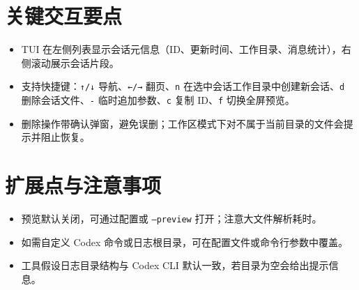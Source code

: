 \documentclass[12pt]{article}
\begin{document}
\section{关键交互要点}
\begin{itemize}[leftmargin=2em]
  \item TUI 在左侧列表显示会话元信息（ID、更新时间、工作目录、消息统计），右侧滚动展示会话片段。
  \item 支持快捷键：\texttt{↑/↓} 导航、\texttt{←/→} 翻页、\texttt{n} 在选中会话工作目录中创建新会话、\texttt{d} 删除会话文件、\texttt{-} 临时追加参数、\texttt{c} 复制 ID、\texttt{f} 切换全屏预览。
  \item 删除操作带确认弹窗，避免误删；工作区模式下对不属于当前目录的文件会提示并阻止恢复。
\end{itemize}

\section{扩展点与注意事项}
\begin{itemize}[leftmargin=2em]
  \item 预览默认关闭，可通过配置或 \texttt{--preview} 打开；注意大文件解析耗时。
  \item 如需自定义 Codex 命令或日志根目录，可在配置文件或命令行参数中覆盖。
  \item 工具假设日志目录结构与 Codex CLI 默认一致，若目录为空会给出提示信息。
\end{itemize}
\end{document}
